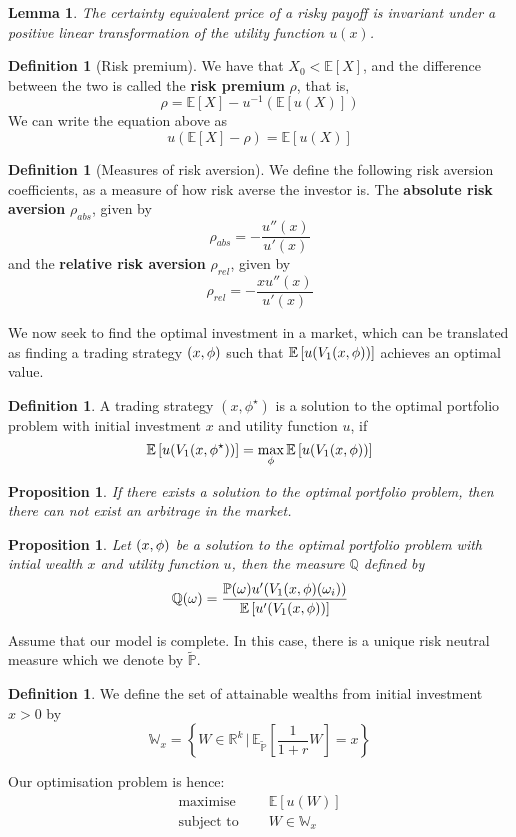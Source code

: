 \documentclass[10pt, oneside, reqno]{amsart}
\theoremstyle{plain}%
\newtheorem{lem}[thm]{Lemma}
\newtheorem{prop}[thm]{Proposition}
\theoremstyle{definition}
\newtheorem{defn}[thm]{Definition}
\theoremstyle{remark}
\newcommand{\expc}[1]{\mathbb{E}\left[#1\right]}
\newcommand{\expp}[1]{\mathbb{E}_{\rnm}\left[#1\right]}
\newcommand{\prob}[1]{\mathbb{P}(#1)}
\newcommand{\given}{ \, | \,}
\newcommand{\Q}{\mathbb{Q}}
\newcommand{\R}{\mathbb{R}}
\newcommand{\rnm}{\tilde{\mathbb{P}}}
\begin{document}
\begin{lem}
	The certainty equivalent price of a risky payoff is invariant under a positive linear transformation of the utility function $u(x)$. 
\end{lem}




\begin{defn}[Risk premium]
	We have that $X_0 < \expc{X}$, and the difference between the two is called the \textbf{risk premium} $\rho$, that is, \[
		\rho = \expc{X} - u^{-1} \left( \expc{u(X)} \right) 
	\]
We can write the equation above as \[
	u(\expc{X} - \rho) = \expc{u(X)}
\]
\end{defn}

\begin{defn}[Measures of risk aversion]
	We define the following risk aversion coefficients, as a measure of how risk averse the investor is.
	The \textbf{absolute risk aversion} $\rho_{abs}$, given by \[
		\rho_{abs} = - \frac{u''(x)}{u'(x)}
	\]   and the \textbf{relative risk aversion} $\rho_{rel}$, given by \[
		\rho_{rel} = - \frac{ x u''(x)}{u'(x)}
	\]  
\end{defn}

We now seek to find the optimal investment in a market, which can be translated as finding a trading strategy $(x,\phi)$ such that $\expc{u(V_1 \tst)}$ achieves an optimal value.

\begin{defn}
	A trading strategy $(x,\phi^\star)$ is a solution to the optimal portfolio problem with initial investment $x$ and utility function $u$, if \[
		\expc{u(V_1(x,\phi^\star))} = \max_{\phi} \expc{u(V_1 \tst)}
	\]
\end{defn}

\begin{prop}
	If there exists a solution to the optimal portfolio problem, then there can not exist an arbitrage in the market.
\end{prop}

\begin{prop}
	Let $(x,\phi)$ be a solution to the optimal portfolio problem with intial wealth $x$ and utility function $u$, then the measure $\Q$ defined by \[
		\Q(\omega) = \frac{\prob{\omega} u'(V_1 \tst(\omega_i))}{\expc{u'(V_1 \tst)}}
	\]
\end{prop}

Assume that our model is complete.  In this case, there is a unique risk neutral measure which we denote by $\rnm$.

\begin{defn}
	We define the set of attainable wealths from initial investment $x > 0$ by \[
		\mathbb{W}_x = \left\{ W  \in \R^k \given \expp{\frac{1}{1+r}W} = x \right\}
	\]
	
	Our optimisation problem is hence: \begin{align*}
		\text{maximise } \quad &\expc{u(W)} \\
		\text{subject to } \quad &W \in \mathbb{W}_x
	\end{align*}
\end{defn}
\end{document}
